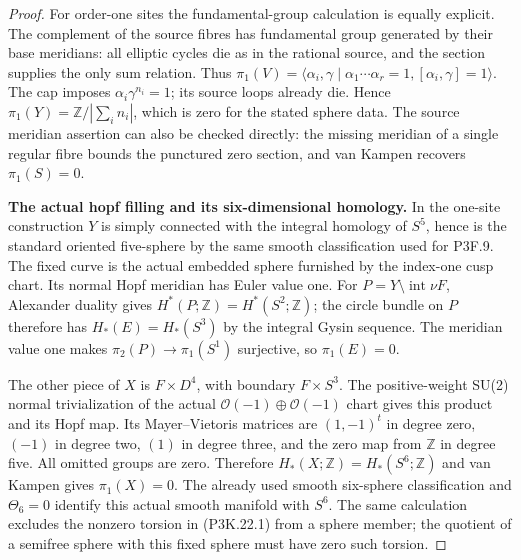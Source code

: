 \begin{proof}
For order-one sites the fundamental-group calculation is equally
explicit.  The complement of the source fibres has fundamental
group generated by their base meridians: all elliptic cycles die
as in the rational source, and the section supplies the only sum
relation.  Thus
\(\pi_1(V)=\langle\alpha_i,\gamma\mid
\alpha_1\cdots\alpha_r=1,[\alpha_i,\gamma]=1\rangle\).
The cap imposes \(\alpha_i\gamma^{n_i}=1\); its source loops
already die.  Hence \(\pi_1(Y)=\mathbb Z/|\sum_i n_i|\), which
is zero for the stated sphere data.  The source meridian assertion
can also be checked directly: the missing meridian of a single
regular fibre bounds the punctured zero section, and van Kampen
recovers \(\pi_1(S)=0\).

\par\medskip\noindent\textbf{The actual hopf filling and its six-dimensional homology.}\enspace
In the one-site construction \(Y\) is simply connected with the
integral homology of \(S^5\), hence is the standard oriented
five-sphere by the same smooth classification used for P3F.9.
The fixed curve is the actual embedded sphere furnished by the
index-one cusp chart.  Its normal Hopf meridian has Euler value one.
For \(P=Y\setminus\operatorname{int}\nu F\), Alexander duality
gives \(H^*(P;\mathbb Z)=H^*(S^2;\mathbb Z)\); the circle
bundle on \(P\) therefore has \(H_*(E)=H_*(S^3)\) by the
integral Gysin sequence.  The meridian value one makes
\(\pi_2(P)\to\pi_1(S^1)\) surjective, so \(\pi_1(E)=0\).

The other piece of \(X\) is \(F\times D^4\), with boundary
\(F\times S^3\).  The positive-weight SU(2) normal trivialization
of the actual \(\mathcal O(-1)\oplus\mathcal O(-1)\) chart gives
this product and its Hopf map.  Its Mayer--Vietoris matrices are
\((1,-1)^t\) in degree zero, \((-1)\) in degree two,
\((1)\) in degree three, and the zero map from \(\mathbb Z\)
in degree five.  All omitted groups are zero.  Therefore
\(H_*(X;\mathbb Z)=H_*(S^6;\mathbb Z)\) and van Kampen gives
\(\pi_1(X)=0\).  The already used smooth six-sphere classification
and \(\Theta_6=0\) identify this actual smooth manifold with
\(S^6\).  The same calculation excludes the nonzero torsion in
(P3K.22.1) from a sphere member; the quotient of a semifree sphere
with this fixed sphere must have zero such torsion.


\end{proof}
